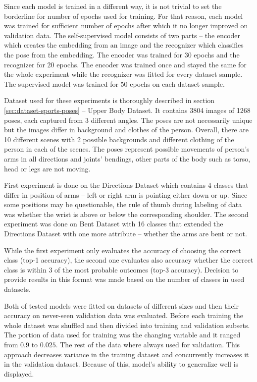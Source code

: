 Since each model is trained in a different way, it is not trivial to set the borderline for number of epochs used for training. For that reason, each model was trained for sufficient number of epochs after which it no longer improved on validation data. The self-supervised model consists of two parts -- the encoder which creates the embedding from an image and the recognizer which classifies the pose from the embedding. The encoder was trained for 30 epochs and the recognizer for 20 epochs. The encoder was trained once and stayed the same for the whole experiment while the recognizer was fitted for every dataset sample. The supervised model was trained for 50 epochs on each dataset sample.

Dataset used for these experiments is thoroughly described in section \ref{sec:dataset-sports-poses} -- Upper Body Dataset. It contains 3804 images of 1268 poses, each captured from 3 different angles. The poses are not necessarily unique but the images differ in background and clothes of the person. Overall, there are 10 different scenes with 2 possible backgrounds and different clothing of the person in each of the scenes. The poses represent possible movements of person's arms in all directions and joints' bendings, other parts of the body such as torso, head or legs are not moving.

First experiment is done on the Directions Dataset which contains 4 classes that differ in position of arms -- left or right arm is pointing either down or up. Since some positions may be questionable, the rule of thumb during labeling of data was whether the wrist is above or below the corresponding shoulder. The second experiment was done on Bent Dataset with 16 classes that extended the Directions Dataset with one more attribute -- whether the arms are bent or not.

While the first experiment only evaluates the accuracy of choosing the correct class (top-1 accuracy), the second one evaluates also accuracy whether the correct class is within 3 of the most probable outcomes (top-3 accuracy). Decision to provide results in this format was made based on the number of classes in used datasets.

Both of tested models were fitted on datasets of different sizes and then their accuracy on never-seen validation data was evaluated. Before each training the whole dataset was shuffled and then divided into training and validation subsets. The portion of data used for training was the changing variable and it ranged from $0.9$ to $0.025$. The rest of the data where always used for validation. This approach decreases variance in the training dataset and concurrently increases it in the validation dataset. Because of this, model's ability to generalize well is displayed.

